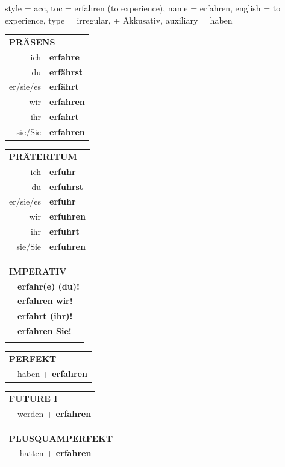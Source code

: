 \begin{verbentry}{
  style = {acc},
  toc = {erfahren (to experience)},
  name = {erfahren},
  english = {to experience},
  type = {irregular, + Akkusativ},
  auxiliary = {haben}
}
  \begin{tabular}{rl}
     \multicolumn{2}{l}{\textbf{PRÄSENS} }\\
    ich & \textbf{erfahre}\\
    du & \textbf{erf\"ahrst}\\
    er/sie/es & \textbf{erf\"ahrt}\\
    wir & \textbf{erfahren}\\
    ihr & \textbf{erfahrt}\\
    sie/Sie & \textbf{erfahren}\\
  \end{tabular}
  \hfill
     \begin{tabular}{rl}
    \multicolumn{2}{l}{\textbf{PRÄTERITUM} }\\
    ich & \textbf{erfuhr}\\
    du & \textbf{erfuhrst}\\
    er/sie/es & \textbf{erfuhr}\\
    wir & \textbf{erfuhren}\\
    ihr & \textbf{erfuhrt}\\
    sie/Sie & \textbf{erfuhren}\\
  \end{tabular}
  \hfill
  \begin{tabular}{rl}
     \multicolumn{2}{l}{\textbf{IMPERATIV} }\\
   & \textbf{erfahr(e) (du)!}\\
   & \textbf{erfahren wir!}\\
   & \textbf{erfahrt (ihr)!}\\
   & \textbf{erfahren Sie!}\\
   & \vspace{10pt}
  \end{tabular}

    \vspace{10pt}

 \begin{tabular}{rl}
     \multicolumn{2}{l}{\textbf{PERFEKT}}\\
  &  haben + \textbf{erfahren}\\
  \end{tabular}
\hfill
   \begin{tabular}{rl}
   
    \multicolumn{2}{l}{\textbf{FUTURE I} }\\
  &  werden + \textbf{erfahren}\\
 
  \end{tabular}
\hfill
   \begin{tabular}{rl}
      \multicolumn{2}{l}{\textbf{PLUSQUAMPERFEKT}}\\
  &  hatten + \textbf{erfahren}\\
  \end{tabular}
  

\end{verbentry}
